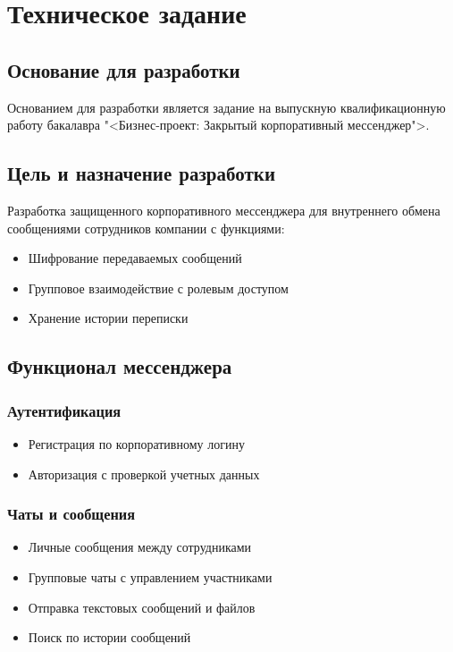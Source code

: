 \section{Техническое задание}
\subsection{Основание для разработки}

Основанием для разработки является задание на выпускную квалификационную работу бакалавра "<Бизнес-проект: Закрытый корпоративный мессенджер">.

\subsection{Цель и назначение разработки}

Разработка защищенного корпоративного мессенджера для внутреннего обмена сообщениями сотрудников компании с функциями:
\begin{itemize}
	\item Шифрование передаваемых сообщений
	\item Групповое взаимодействие с ролевым доступом
	\item Хранение истории переписки
\end{itemize}

	
\subsection{Функционал мессенджера}

\subsubsection{Аутентификация}
\begin{itemize}
	\item Регистрация по корпоративному логину
	\item Авторизация с проверкой учетных данных
\end{itemize}

\subsubsection{Чаты и сообщения}
\begin{itemize}
	\item Личные сообщения между сотрудниками
	\item Групповые чаты с управлением участниками
	\item Отправка текстовых сообщений и файлов
	\item Поиск по истории сообщений
\end{itemize}

